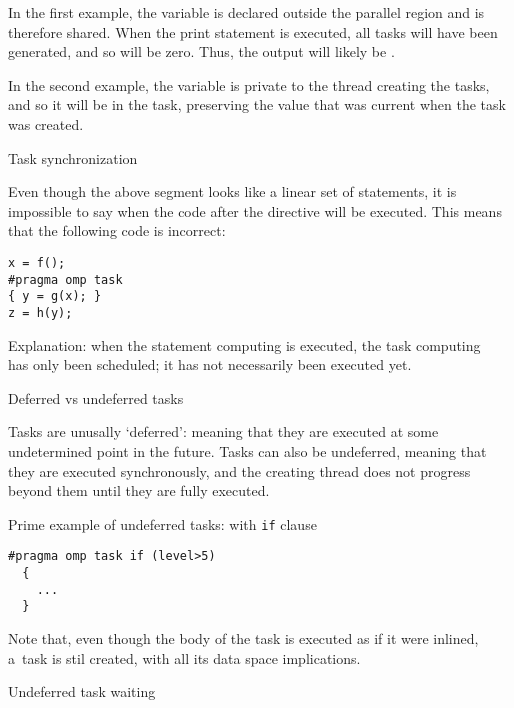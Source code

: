 In the first example,
the variable  is declared outside the
parallel region and is therefore shared. When the print statement is
executed, all tasks will have been generated, and so  will be
zero. Thus, the output will likely be .

In the second example,
the  variable is private to the thread creating the tasks,
and so it will be  in the task, preserving the value
that was current when the task was created.


 {Task synchronization}

Even though the above segment looks like a linear set of statements,
it is impossible to say when
the code after the  directive will be executed.
This means that the following code is incorrect:
\begin{lstlisting}[language=omp]
x = f();
#pragma omp task
{ y = g(x); }
z = h(y);  
\end{lstlisting}
Explanation: when the statement computing  is executed, the task
computing~ has only been scheduled;
it has not necessarily been executed yet.

 {Deferred vs undeferred tasks}

Tasks are unusally `deferred': meaning that they are executed
at some undetermined point in the future.
Tasks can also be undeferred, meaning that they are executed
synchronously, and the creating thread does not progress beyond them
until they are fully executed.

Prime example of undeferred tasks: with \lstinline[language=omp]{if} clause
\begin{lstlisting}[language=omp]
#pragma omp task if (level>5)
  {
    ...
  }
\end{lstlisting}
Note that, even though the body of the task is executed as if it were inlined,
a~task is stil created, with all its data space implications.

 {Undeferred task waiting}

